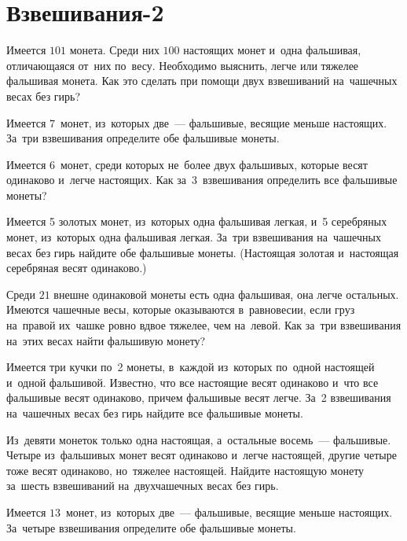 
\section*{Взвешивания-2}


\begin{problems}

\item
Имеется $101$ монета.
Среди них $100$ настоящих монет и~одна фальшивая, отличающаяся от~них по~весу.
Необходимо выяснить, легче или тяжелее фальшивая монета.
Как это сделать при помощи двух взвешиваний на~чашечных весах без гирь?

\item
Имеется $7$~монет, из~которых две~--- фальшивые, весящие меньше настоящих.
За~три взвешивания определите обе фальшивые монеты.

\item
Имеется 6~монет, среди которых не~более двух фальшивых, которые весят
одинаково и~легче настоящих.
Как за~3~взвешивания определить все фальшивые монеты?

\item
Имеется 5 золотых монет, из~которых одна фальшивая легкая, и~5 серебряных
монет, из~которых одна фальшивая легкая.
За~три взвешивания на~чашечных весах без гирь найдите обе фальшивые монеты.
(Настоящая золотая и~настоящая серебряная весят одинаково.)

\item
Среди $21$ внешне одинаковой монеты есть одна фальшивая, она легче остальных.
Имеются чашечные весы, которые оказываются в~равновесии, если груз на~правой
их~чашке ровно вдвое тяжелее, чем на~левой.
Как за~три взвешивания на~этих весах найти фальшивую монету?

\item
Имеется три кучки по~2 монеты, в~каждой из~которых по~одной настоящей и~одной
фальшивой.
Известно, что все настоящие весят одинаково и~что все фальшивые весят
одинаково, причем фальшивые весят легче.
За~2 взвешивания на~чашечных весах без гирь найдите все фальшивые монеты.

\item
Из~девяти монеток только одна настоящая, а~остальные восемь~--- фальшивые.
Четыре из~фальшивых монет весят одинаково и~легче настоящей, другие четыре тоже
весят одинаково, но~тяжелее настоящей.
Найдите настоящую монету за~шесть взвешиваний на~двухчашечных весах без гирь.

\item
Имеется $13$~монет, из~которых две~--- фальшивые, весящие меньше настоящих.
За~четыре взвешивания определите обе фальшивые монеты.

\end{problems}

